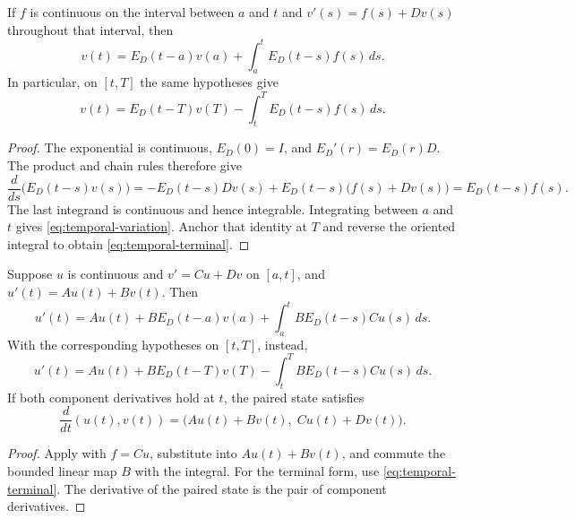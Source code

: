 \begin{theorem}
\label{thm:temporal-variation}
If $f$ is continuous on the interval between $a$ and $t$ and
$v'(s)=f(s)+Dv(s)$ throughout that interval, then
\begin{equation}\label{eq:temporal-variation}
 v(t)=E_D(t-a)v(a)+\int_a^t E_D(t-s)f(s)\,ds.
\end{equation}
In particular, on $[t,T]$ the same hypotheses give
\begin{equation}\label{eq:temporal-terminal}
 v(t)=E_D(t-T)v(T)-\int_t^T E_D(t-s)f(s)\,ds.
\end{equation}
\end{theorem}
\begin{proof}
The exponential is continuous, $E_D(0)=I$, and
$E_D'(r)=E_D(r)D$. The product and chain rules therefore give
\[
 \frac{d}{ds}\bigl(E_D(t-s)v(s)\bigr)
 =-E_D(t-s)Dv(s)+E_D(t-s)\bigl(f(s)+Dv(s)\bigr)
 =E_D(t-s)f(s).
\]
The last integrand is continuous and hence integrable. Integrating
between $a$ and $t$ gives \eqref{eq:temporal-variation}. Anchor that
identity at $T$ and reverse the oriented integral to obtain
\eqref{eq:temporal-terminal}.
\end{proof}

\begin{theorem}
\label{thm:temporal-reductions}
Suppose $u$ is continuous and $v'=Cu+Dv$ on $[a,t]$, and
$u'(t)=Au(t)+Bv(t)$. Then
\begin{equation}\label{eq:temporal-memory}
 u'(t)=Au(t)+BE_D(t-a)v(a)
       +\int_a^t BE_D(t-s)Cu(s)\,ds.
\end{equation}
With the corresponding hypotheses on $[t,T]$, instead,
\begin{equation}\label{eq:temporal-future}
 u'(t)=Au(t)+BE_D(t-T)v(T)
       -\int_t^T BE_D(t-s)Cu(s)\,ds.
\end{equation}
If both component derivatives hold at $t$, the paired state satisfies
\[
 \frac{d}{dt}(u(t),v(t))
 =\bigl(Au(t)+Bv(t),\;Cu(t)+Dv(t)\bigr).
\]
\end{theorem}
\begin{proof}
Apply  with $f=Cu$, substitute into
$Au(t)+Bv(t)$, and commute the bounded linear map $B$ with the
integral. For the terminal form, use \eqref{eq:temporal-terminal}.
The derivative of the paired state is the pair of component derivatives.
\end{proof}

